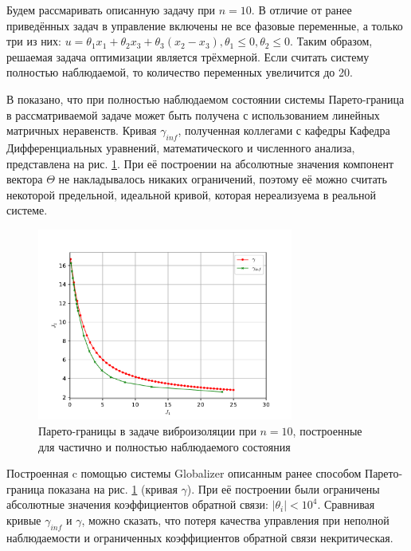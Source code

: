 Будем рассмаривать описанную задачу при \(n=10\). В отличие от ранее приведённых задач в управление
включены не все фазовые переменные, а только три из них: \(u=\theta_1 x_1 + \theta_2 x_3 + \theta_3(x_2-x_3), \theta_1 \leqslant 0, \theta_2\leqslant 0\).
Таким образом, решаемая задача оптимизации является трёхмерной. Если считать систему
полностью наблюдаемой, то количество переменных увеличится до 20.

В \cite{optControl} показано, что при полностью наблюдаемом состоянии системы Парето-граница
в рассматриваемой задаче может быть получена с использованием линейных матричных
неравенств. Кривая \(\gamma_{inf}\), полученная коллегами с кафедры Кафедра Дифференциальных уравнений, математического и численного анализа,
представлена на рис. \ref{fig:pareto}. При её построении на абсолютные значения компонент
вектора \(\Theta\) не накладывалось никаких ограничений, поэтому её можно считать
некоторой предельной, идеальной кривой, которая нереализуема в реальной системе.

\begin{figure}[ht]
    \center
    \includegraphics[width=0.75\textwidth]{images/solution.pdf}
    \caption{Парето-границы в задаче виброизоляции при \(n=10\), построенные для
    частично и полностью наблюдаемого состояния}
    \label{fig:pareto}
\end{figure}

Построенная c помощью системы Globalizer описанным ранее способом Парето-граница
показана на рис. \ref{fig:pareto} (кривая \(\gamma\)). При её построении были ограничены
абсолютные значения коэффициентов обратной связи: \(|\theta_i|<10^4\). Сравнивая
кривые \(\gamma_{inf}\) и \(\gamma\), можно сказать, что потеря качества управления при неполной наблюдаемости
и ограниченных коэффициентов обратной связи некритическая.
